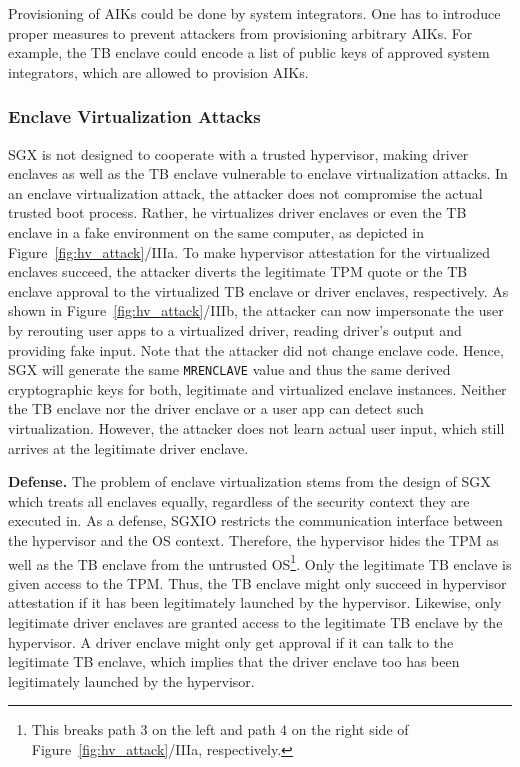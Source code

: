 \documentclass{sig-alternate-05-2015}
\begin{document}
Provisioning of AIKs could be done by system integrators. 
One has to introduce proper measures to prevent attackers from provisioning arbitrary AIKs. 
For example, the TB enclave could encode a list of public keys of approved system integrators, which are allowed to provision AIKs.

\subsubsection{Enclave Virtualization Attacks}\label{sec:driver_virtualization}
SGX is not designed to cooperate with a trusted hypervisor, making driver enclaves as well as the TB enclave vulnerable to enclave virtualization attacks. 
In an enclave virtualization attack, the attacker does not compromise the actual trusted boot process. 
Rather, he virtualizes driver enclaves or even the TB enclave in a fake environment on the same computer, as depicted in Figure~\ref{fig:hv_attack}/IIIa. 
To make hypervisor attestation for the virtualized enclaves succeed, the attacker diverts the legitimate TPM quote or the TB enclave approval to the virtualized TB enclave or driver enclaves, respectively. 
As shown in Figure~\ref{fig:hv_attack}/IIIb, the attacker can now impersonate the user by rerouting user apps to a virtualized driver, reading driver's output and providing fake input. 
Note that the attacker did not change enclave code. 
Hence, SGX will generate the same \verb!MRENCLAVE! value and thus the same derived cryptographic keys for both, legitimate and virtualized enclave instances. 
Neither the TB enclave nor the driver enclave or a user app can detect such virtualization. 
However, the attacker does not learn actual user input, which still arrives at the legitimate driver enclave. 

\textbf{Defense.}
The problem of enclave virtualization stems from the design of SGX which treats all enclaves equally, regardless of the security context they are executed in. 
As a defense, SGXIO restricts the communication interface between the hypervisor and the OS context. 
Therefore, the hypervisor hides the TPM as well as the TB enclave from the untrusted OS\footnote{This breaks path 3 on the left and path 4 on the right side of Figure~\ref{fig:hv_attack}/IIIa, respectively.}. 
Only the legitimate TB enclave is given access to the TPM. 
Thus, the TB enclave might only succeed in hypervisor attestation if it has been legitimately launched by the hypervisor. 
Likewise, only legitimate driver enclaves are granted access to the legitimate TB enclave by the hypervisor. 
A driver enclave might only get approval if it can talk to the legitimate TB enclave, which implies that the driver enclave too has been legitimately launched by the hypervisor. 
\end{document}
